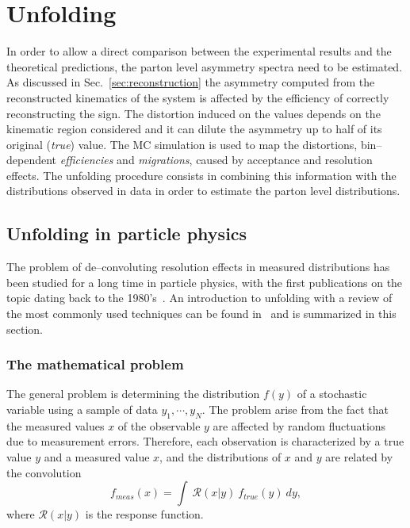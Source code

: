 \chapter{Unfolding}
\label{sec:unfolding}

In order to allow a direct comparison between the experimental results
and the theoretical predictions, the parton level asymmetry spectra need
to be estimated.
As discussed in Sec.~\ref{sec:reconstruction} the asymmetry computed
from the reconstructed kinematics of the \ttbar{} system is affected
by the efficiency of correctly reconstructing the \dy{} sign. The
distortion induced on the \ac{} values depends on the kinematic region
considered and it can dilute the asymmetry up to half of its original
({\it true}) value.
The \ttbar{} MC simulation is used to map the distortions,
bin--dependent {\it efficiencies} and {\it migrations}, caused by
acceptance and resolution effects. The unfolding procedure consists in
combining this information with the distributions observed in data in
order to estimate the parton level distributions.

\section{Unfolding in particle physics}

The problem of de--convoluting  resolution effects in measured
distributions has been studied for a long time in particle physics,
with the first publications on the topic dating back to the
1980's~\cite{Blobel:157405}. An introduction to unfolding with a
review of the most commonly used techniques can be found
in~\cite{Cowan:2002in} and is summarized in this section. 

\subsection{The mathematical problem}

The general problem is determining the distribution $f(y)$ of a
stochastic variable using a sample of data $y_1,\cdots{},y_N$.
The problem arise from the fact that the measured values $x$ of the
observable $y$ are affected by random fluctuations due to measurement
errors. Therefore, each observation is characterized by a true value
$y$ and a measured value $x$, and the distributions of $x$ and $y$ are
related by the convolution
\begin{equation}
\label{eq:convolution}
f_{meas}(x) = \int~\mathcal{R}(x|y)~f_{true}(y)~dy,
\end{equation}
where $\mathcal{R}(x|y)$ is the response function.

